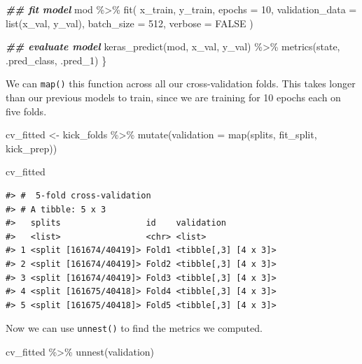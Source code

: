 \documentclass[
]{krantz}
\makeatletter
\newenvironment{Shaded}{\begin{snugshade}}{\end{snugshade}}
\newcommand{\AttributeTok}[1]{\textcolor[rgb]{0.77,0.63,0.00}{#1}}
\newcommand{\ConstantTok}[1]{\textcolor[rgb]{0.00,0.00,0.00}{#1}}
\newcommand{\DecValTok}[1]{\textcolor[rgb]{0.00,0.00,0.81}{#1}}
\newcommand{\DocumentationTok}[1]{\textcolor[rgb]{0.56,0.35,0.01}{\textbf{\textit{#1}}}}
\newcommand{\FunctionTok}[1]{\textcolor[rgb]{0.00,0.00,0.00}{#1}}
\newcommand{\NormalTok}[1]{#1}
\newcommand{\OtherTok}[1]{\textcolor[rgb]{0.56,0.35,0.01}{#1}}
\newcommand{\SpecialCharTok}[1]{\textcolor[rgb]{0.00,0.00,0.00}{#1}}
\newenvironment{kframe}{%
\medskip{}
\setlength{\fboxsep}{.8em}
 \def\at@end@of@kframe{}%
 \ifinner\ifhmode%
  \def\at@end@of@kframe{\end{minipage}}%
  \begin{minipage}{\columnwidth}%
 \fi\fi%
 \def\FrameCommand##1{\hskip\@totalleftmargin \hskip-\fboxsep
 \colorbox{shadecolor}{##1}\hskip-\fboxsep
     \hskip-\linewidth \hskip-\@totalleftmargin \hskip\columnwidth}%
 \MakeFramed {\advance\hsize-\width
   \@totalleftmargin\z@ \linewidth\hsize
   \@setminipage}}%
 {\par\unskip\endMakeFramed%
 \at@end@of@kframe}
\renewenvironment{Shaded}{\begin{kframe}}{\end{kframe}}
\makeatother
\begin{document}
\begin{Shaded}
\begin{Highlighting}[]
  \DocumentationTok{\#\# fit model}
\NormalTok{  mod }\SpecialCharTok{\%\textgreater{}\%}
    \FunctionTok{fit}\NormalTok{(}
\NormalTok{      x\_train,}
\NormalTok{      y\_train,}
      \AttributeTok{epochs =} \DecValTok{10}\NormalTok{,}
      \AttributeTok{validation\_data =} \FunctionTok{list}\NormalTok{(x\_val, y\_val),}
      \AttributeTok{batch\_size =} \DecValTok{512}\NormalTok{,}
      \AttributeTok{verbose =} \ConstantTok{FALSE}
\NormalTok{    )}
  
  \DocumentationTok{\#\# evaluate model}
  \FunctionTok{keras\_predict}\NormalTok{(mod, x\_val, y\_val) }\SpecialCharTok{\%\textgreater{}\%}
    \FunctionTok{metrics}\NormalTok{(state, .pred\_class, .pred\_1)}
\NormalTok{\}}
\end{Highlighting}
\end{Shaded}

We can \texttt{map()} this function across all our cross-validation folds. This takes longer than our previous models to train, since we are training for 10 epochs each on five folds.

\begin{Shaded}
\begin{Highlighting}[]
\NormalTok{cv\_fitted }\OtherTok{\textless{}{-}}\NormalTok{ kick\_folds }\SpecialCharTok{\%\textgreater{}\%}
  \FunctionTok{mutate}\NormalTok{(}\AttributeTok{validation =} \FunctionTok{map}\NormalTok{(splits, fit\_split, kick\_prep))}

\NormalTok{cv\_fitted}
\end{Highlighting}
\end{Shaded}

\begin{verbatim}
#> #  5-fold cross-validation 
#> # A tibble: 5 x 3
#>   splits                 id    validation          
#>   <list>                 <chr> <list>              
#> 1 <split [161674/40419]> Fold1 <tibble[,3] [4 x 3]>
#> 2 <split [161674/40419]> Fold2 <tibble[,3] [4 x 3]>
#> 3 <split [161674/40419]> Fold3 <tibble[,3] [4 x 3]>
#> 4 <split [161675/40418]> Fold4 <tibble[,3] [4 x 3]>
#> 5 <split [161675/40418]> Fold5 <tibble[,3] [4 x 3]>
\end{verbatim}

Now we can use \texttt{unnest()} to find the metrics we computed.

\begin{Shaded}
\begin{Highlighting}[]
\NormalTok{cv\_fitted }\SpecialCharTok{\%\textgreater{}\%}
  \FunctionTok{unnest}\NormalTok{(validation)}
\end{Highlighting}
\end{Shaded}
\end{document}
